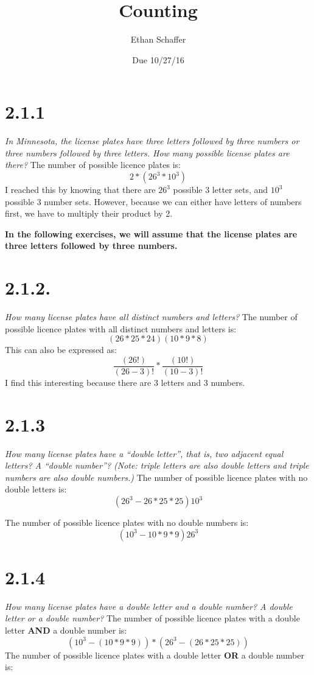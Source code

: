 \documentclass[11pt]{article} %
\title{Counting}
\author{Ethan Schaffer}
\date{Due 10/27/16}
\begin{document}
\section* {2.1.1}
\textit{In Minnesota, the license plates have three letters followed by three numbers or three numbers followed by three letters. How many possible license plates are there?}
The number of possible licence plates is:
\begin{equation} 2*(26^3*10^3) \end{equation}
I reached this by knowing that there are $26^3$ possible 3 letter sets, and $10^3$ possible 3 number sets. 
However, because we can either have letters of numbers first, we have to multiply their product by 2. 

\textbf{In the following exercises, we will assume that the license plates are three
letters followed by three numbers.}

\section*{2.1.2.}
\textit{How many license plates have all distinct numbers and letters?}
The number of possible licence plates with all distinct numbers and letters is:
\begin{equation} (26*25*24)(10*9*8) \end{equation}
This can also be expressed as:
\begin{equation} \frac{(26!)}{(26-3)!}*\frac{(10!)}{(10-3)!} \end{equation}
I find this interesting because there are 3 letters and 3 numbers. 

\section*{2.1.3}
\textit{How many license plates have a “double letter”, that is, two adjacent equal letters? A “double number”? (Note: triple letters are also double letters and triple numbers are also double numbers.)}
The number of possible licence plates with no double letters is:
\begin{equation} (26^3  - 26*25*25)10^3 \end{equation}

The number of possible licence plates with no double numbers is:
\begin{equation} (10^3  - 10*9*9)26^3 \end{equation}

\section*{2.1.4}
\textit{How many license plates have a double letter and a double number? A double letter or a double number?}
The number of possible licence plates with a double letter \textbf{AND} a double number is:
\begin{equation} (10^3-(10*9*9)) * (26^3-(26*25*25)) \end{equation}
The number of possible licence plates with a double letter \textbf{OR} a double number is:
\end{document}
